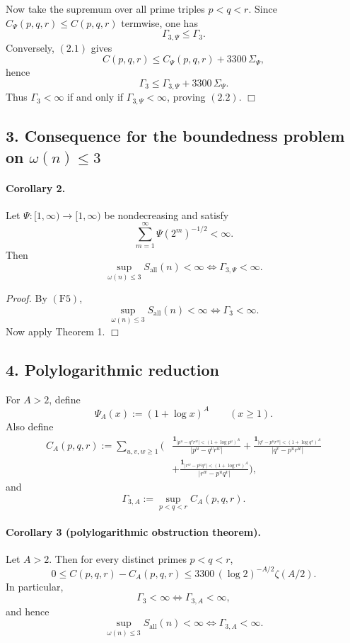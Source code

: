 Now take the supremum over all prime triples \(p<q<r\). Since \(C_\Psi(p,q,r)\le C(p,q,r)\) termwise, one has
\[
\Gamma_{3,\Psi}\le \Gamma_3.
\]
Conversely, \((2.1)\) gives
\[
C(p,q,r)\le C_\Psi(p,q,r)+3300\,\Sigma_\Psi,
\]
hence
\[
\Gamma_3\le \Gamma_{3,\Psi}+3300\,\Sigma_\Psi.
\]
Thus \(\Gamma_3<\infty\) if and only if \(\Gamma_{3,\Psi}<\infty\), proving \((2.2)\).
\hfill\(\Box\)

\subsection*{3. Consequence for the boundedness problem on \(\omega(n)\le 3\)}

\paragraph{Corollary 2.}
Let \(\Psi:[1,\infty)\to [1,\infty)\) be nondecreasing and satisfy
\[
\sum_{m=1}^{\infty}\Psi(2^m)^{-1/2}<\infty.
\]
Then
\[
\sup_{\omega(n)\le 3} S_{\mathrm{all}}(n)<\infty
\iff
\Gamma_{3,\Psi}<\infty.
\tag{3.1}
\]

\emph{Proof.}
By \((\mathrm{F5})\),
\[
\sup_{\omega(n)\le 3} S_{\mathrm{all}}(n)<\infty
\iff
\Gamma_3<\infty.
\]
Now apply Theorem 1.
\hfill\(\Box\)

\subsection*{4. Polylogarithmic reduction}

For \(A>2\), define
\[
\Psi_A(x):=(1+\log x)^A
\qquad (x\ge 1).
\]
Also define
\[
\begin{aligned}
C_A(p,q,r):=
\sum_{u,v,w\ge 1}
\Bigg(
&\frac{\mathbf 1_{|p^u-q^v r^w|<(1+\log p^u)^A}}{|p^u-q^v r^w|}
+
\frac{\mathbf 1_{|q^v-p^u r^w|<(1+\log q^v)^A}}{|q^v-p^u r^w|}
\\
&+
\frac{\mathbf 1_{|r^w-p^u q^v|<(1+\log r^w)^A}}{|r^w-p^u q^v|}
\Bigg),
\end{aligned}
\]
and
\[
\Gamma_{3,A}:=\sup_{p<q<r} C_A(p,q,r).
\]

\paragraph{Corollary 3 (polylogarithmic obstruction theorem).}
Let \(A>2\). Then for every distinct primes \(p<q<r\),
\[
0\le C(p,q,r)-C_A(p,q,r)
\le
3300\,(\log 2)^{-A/2}\zeta(A/2).
\tag{4.1}
\]
In particular,
\[
\Gamma_3<\infty \iff \Gamma_{3,A}<\infty,
\tag{4.2}
\]
and hence
\[
\sup_{\omega(n)\le 3} S_{\mathrm{all}}(n)<\infty
\iff
\Gamma_{3,A}<\infty.
\tag{4.3}
\]

